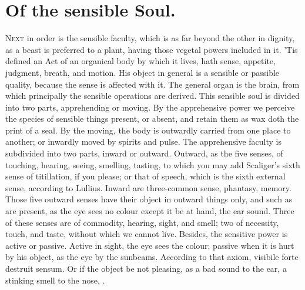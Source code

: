 {%
\section{Of the sensible Soul.}

\lettrine{N}{ext} in order is the sensible faculty, which is as far beyond the other
in dignity, as a beast is preferred to a plant, having those vegetal
powers included in it. 'Tis defined an Act of an organical body by
which it lives, hath sense, appetite, judgment, breath, and motion. His
object in general is a sensible or passible quality, because the sense
is affected with it. The general organ is the brain, from which
principally the sensible operations are derived. This sensible soul is
divided into two parts, apprehending or moving. By the apprehensive
power we perceive the species of sensible things present, or absent,
and retain them as wax doth the print of a seal. By the moving, the
body is outwardly carried from one place to another; or inwardly moved
by spirits and pulse. The apprehensive faculty is subdivided into two
parts, inward or outward. Outward, as the five senses, of touching,
hearing, seeing, smelling, tasting, to which you may add Scaliger's
sixth sense of titillation, if you please; or that of speech, which is
the sixth external sense, according to Lullius. Inward are three-common
sense, phantasy, memory. Those five outward senses have their object in
outward things only, and such as are present, as the eye sees no colour
except it be at hand, the ear sound. Three of these senses are of
commodity, hearing, sight, and smell; two of necessity, touch, and
taste, without which we cannot live. Besides, the sensitive power is
active or passive. Active in sight, the eye sees the colour; passive
when it is hurt by his object, as the eye by the sunbeams. According to
that axiom, visibile forte destruit sensum. Or if the object be
not pleasing, as a bad sound to the ear, a stinking smell to the nose,
\etc{}.
}
